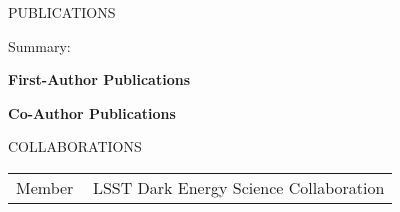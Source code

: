 \documentclass[11pt]{article} %
\begin{document}

\begin{section}{PUBLICATIONS}

Summary: 
    
\textbf{First-Author Publications}
\begin{enumerate}[leftmargin=1.5em]
     
\end{enumerate}

\textbf{Co-Author Publications}
\begin{enumerate}[leftmargin=1.5em]
     
\end{enumerate}

\end{section}

\begin{section}{COLLABORATIONS}

\begin{tabular}{@{}p{0.2\linewidth}@{}p{0.8\linewidth}@{}}
    Member &LSST Dark Energy Science Collaboration \\
\end{tabular}

\end{section}
\end{document}
